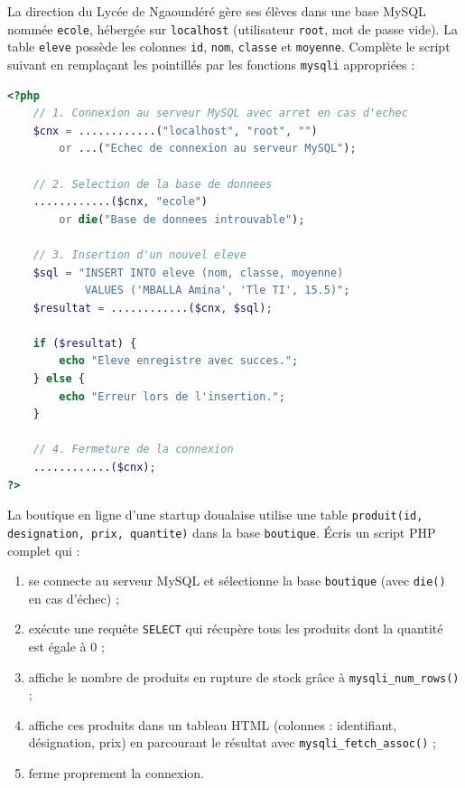 \documentclass[11pt]{article}
\begin{document}
\begin{exercice}
La direction du Lycée de Ngaoundéré gère ses élèves dans une base MySQL nommée \texttt{ecole}, hébergée sur \texttt{localhost} (utilisateur \texttt{root}, mot de passe vide). La table \texttt{eleve} possède les colonnes \texttt{id}, \texttt{nom}, \texttt{classe} et \texttt{moyenne}. Complète le script suivant en remplaçant les pointillés par les fonctions \texttt{mysqli} appropriées :
\begin{lstlisting}[language=Php]
<?php
    // 1. Connexion au serveur MySQL avec arret en cas d'echec
    $cnx = ............("localhost", "root", "")
        or ...("Echec de connexion au serveur MySQL");

    // 2. Selection de la base de donnees
    ............($cnx, "ecole")
        or die("Base de donnees introuvable");

    // 3. Insertion d'un nouvel eleve
    $sql = "INSERT INTO eleve (nom, classe, moyenne)
            VALUES ('MBALLA Amina', 'Tle TI', 15.5)";
    $resultat = ............($cnx, $sql);

    if ($resultat) {
        echo "Eleve enregistre avec succes.";
    } else {
        echo "Erreur lors de l'insertion.";
    }

    // 4. Fermeture de la connexion
    ............($cnx);
?>
\end{lstlisting}
\end{exercice}

\begin{exercice}
La boutique en ligne d'une startup doualaise utilise une table \texttt{produit(id, designation, prix, quantite)} dans la base \texttt{boutique}. Écris un script PHP complet qui :
\begin{enumerate}
\item se connecte au serveur MySQL et sélectionne la base \texttt{boutique} (avec \texttt{die()} en cas d'échec) ;
\item exécute une requête \texttt{SELECT} qui récupère tous les produits dont la quantité est égale à 0 ;
\item affiche le nombre de produits en rupture de stock grâce à \texttt{mysqli\_num\_rows()} ;
\item affiche ces produits dans un tableau HTML (colonnes : identifiant, désignation, prix) en parcourant le résultat avec \texttt{mysqli\_fetch\_assoc()} ;
\item ferme proprement la connexion.
\end{enumerate}
\end{exercice}
\end{document}
